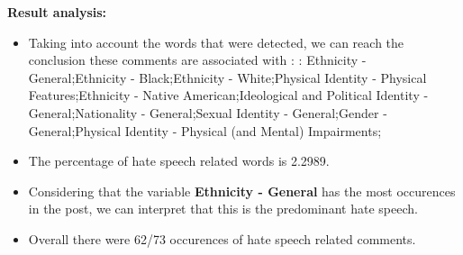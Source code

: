 \documentclass[11pt]{article}
\begin{document}
\textbf{\Large Result analysis:}

\begin{itemize}\item Taking into account the words that were detected, we can reach the conclusion these comments are associated with : : Ethnicity - General;Ethnicity - Black;Ethnicity - White;Physical Identity - Physical Features;Ethnicity - Native American;Ideological and Political Identity - General;Nationality - General;Sexual Identity - General;Gender - General;Physical Identity - Physical (and Mental) Impairments;%

\item The percentage of hate speech related words is 2.2989.

\item Considering that the variable \textbf{Ethnicity - General} has the most occurences in the post, we can interpret that this is the predominant hate speech.

\item Overall there were 62/73 occurences of hate speech related comments.\end{itemize}
\end{document}
